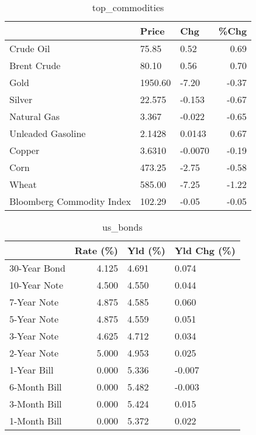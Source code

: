 \documentclass{article}%
\begin{document}
\begin{table}[htbp]%
\caption{top\_commodities}%
\centering%
\begin{adjustbox}{width=1\textwidth}%
\begin{tabular}{lllr}
\toprule
                          &   Price &     Chg &  \%Chg \\
\midrule
               Crude Oil  &   75.85 &    0.52 &  0.69 \\
             Brent Crude  &   80.10 &    0.56 &  0.70 \\
                    Gold  & 1950.60 &   -7.20 & -0.37 \\
                  Silver  &  22.575 &  -0.153 & -0.67 \\
             Natural Gas  &   3.367 &  -0.022 & -0.65 \\
       Unleaded Gasoline  &  2.1428 &  0.0143 &  0.67 \\
                  Copper  &  3.6310 & -0.0070 & -0.19 \\
                    Corn  &  473.25 &   -2.75 & -0.58 \\
                   Wheat  &  585.00 &   -7.25 & -1.22 \\
Bloomberg Commodity Index &  102.29 &   -0.05 & -0.05 \\
\bottomrule
\end{tabular}
%
\end{adjustbox}%
\end{table}

%


\begin{table}[htbp]%
\caption{us\_bonds}%
\centering%
\begin{adjustbox}{width=1\textwidth}%
\begin{tabular}{lrll}
\toprule
             &  Rate (\%) & Yld (\%) & Yld Chg (\%) \\
\midrule
30-Year Bond &     4.125 &   4.691 &       0.074 \\
10-Year Note &     4.500 &   4.550 &       0.044 \\
 7-Year Note &     4.875 &   4.585 &       0.060 \\
 5-Year Note &     4.875 &   4.559 &       0.051 \\
 3-Year Note &     4.625 &   4.712 &       0.034 \\
 2-Year Note &     5.000 &   4.953 &       0.025 \\
 1-Year Bill &     0.000 &   5.336 &      -0.007 \\
6-Month Bill &     0.000 &   5.482 &      -0.003 \\
3-Month Bill &     0.000 &   5.424 &       0.015 \\
1-Month Bill &     0.000 &   5.372 &       0.022 \\
\bottomrule
\end{tabular}
%
\end{adjustbox}%
\end{table}
\end{document}
